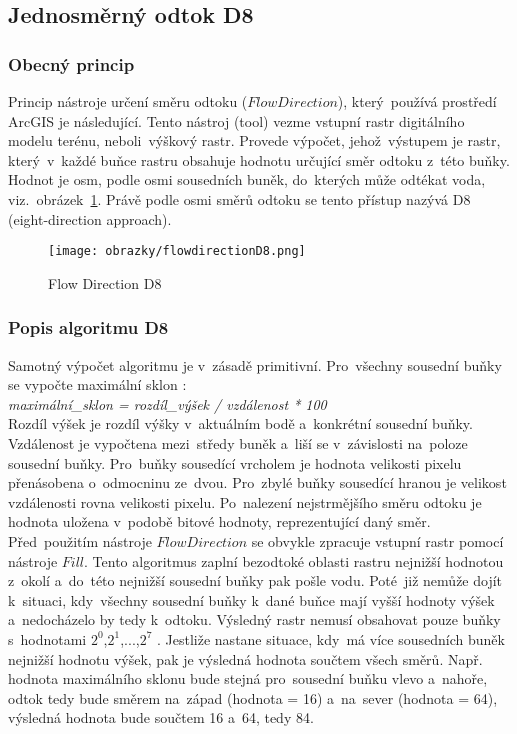 \subsection{Jednosměrný odtok D8} \label{subsection:d8}
\subsubsection{Obecný princip}
Princip nástroje určení směru odtoku ($Flow Direction$), který~používá prostředí ArcGIS je následující. Tento nástroj (tool) vezme vstupní rastr digitálního modelu terénu, neboli~výškový rastr.
Provede výpočet, jehož~výstupem je rastr, který~v~každé buňce rastru obsahuje hodnotu určující směr odtoku z~této buňky. Hodnot je osm, podle osmi sousedních buněk, do~kterých může odtékat voda, viz.~obrázek~\ref{fig:D8}.
Právě podle osmi směrů odtoku se tento přístup nazývá D8 (eight-direction approach).
\begin{figure}[hbt]
  \centering
  \texttt{[image: obrazky/flowdirectionD8.png]}
  \caption{Flow Direction D8 \cite{d8}}
  \label{fig:D8}
\end{figure} \medskip
\subsubsection{Popis algoritmu D8}
Samotný výpočet algoritmu je v~zásadě primitivní. Pro~všechny sousední buňky se vypočte maximální sklon \cite{d8}: \bigskip
\\ \textit{maximální\_sklon = rozdíl\_výšek / vzdálenost * 100}  \bigskip 
\\ Rozdíl výšek je rozdíl výšky v~aktuálním bodě a~konkrétní sousední buňky. Vzdálenost je vypočtena mezi~středy buněk a~liší se v~závislosti na~poloze sousední buňky. 
Pro~buňky sousedící vrcholem je hodnota velikosti pixelu přenásobena o~odmocninu ze~dvou. Pro~zbylé buňky sousedící hranou je velikost vzdálenosti rovna velikosti pixelu. 
Po~nalezení nejstrmějšího směru odtoku je hodnota uložena v~podobě bitové hodnoty, reprezentující daný směr. Před~použitím nástroje $Flow Direction$ se obvykle zpracuje vstupní rastr pomocí nástroje $Fill$.
Tento algoritmus zaplní bezodtoké oblasti rastru nejnižší hodnotou z~okolí a~do~této nejnižší sousední buňky pak pošle vodu.
Poté~již nemůže dojít k~situaci, kdy~všechny sousední buňky k~dané buňce mají vyšší hodnoty výšek a~nedocházelo by tedy k~odtoku. \smallskip
Výsledný rastr nemusí obsahovat pouze buňky s~hodnotami $2^0$,$2^1$,...,$2^7$ \cite{flowdir}. Jestliže nastane situace, kdy~má více sousedních buněk nejnižší hodnotu výšek, pak je výsledná hodnota součtem všech směrů.
Např. hodnota maximálního sklonu bude stejná pro~sousední buňku vlevo a~nahoře, odtok tedy bude směrem na~západ (hodnota = 16) a~na~sever (hodnota = 64), výsledná hodnota bude součtem 16 a~64, tedy 84. 

